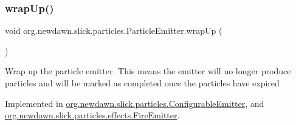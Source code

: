 \subsubsection{\texorpdfstring{wrap\+Up()}{wrapUp()}}
{\footnotesize\ttfamily void org.\+newdawn.\+slick.\+particles.\+Particle\+Emitter.\+wrap\+Up (\begin{DoxyParamCaption}{ }\end{DoxyParamCaption})}

Wrap up the particle emitter. This means the emitter will no longer produce particles and will be marked as completed once the particles have expired 

Implemented in \mbox{\hyperlink{classorg_1_1newdawn_1_1slick_1_1particles_1_1_configurable_emitter_a641b7c71e746caa939d3a2c16976b4e4}{org.\+newdawn.\+slick.\+particles.\+Configurable\+Emitter}}, and \mbox{\hyperlink{classorg_1_1newdawn_1_1slick_1_1particles_1_1effects_1_1_fire_emitter_a8e888bb6d290b9df6883d0ebb35f1067}{org.\+newdawn.\+slick.\+particles.\+effects.\+Fire\+Emitter}}.

